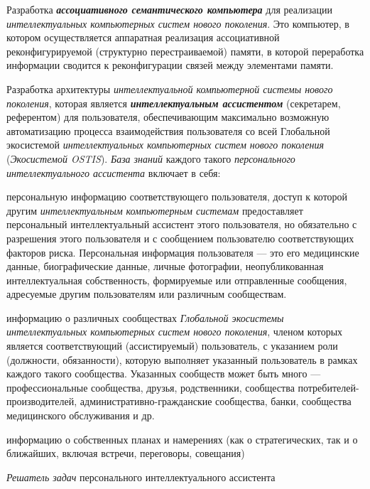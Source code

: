 \begin{textitemize}
	Разработка \textbf{\textit{ассоциативного семантического компьютера}} для реализации \textit{интеллектуальных компьютерных систем нового поколения}. Это  компьютер, в котором осуществляется аппаратная реализация ассоциативной реконфигурируемой (структурно перестраиваемой) памяти, в которой переработка информации сводится к реконфигурации связей между элементами памяти.
	\medskip
	\item Разработка архитектуры \textit{интеллектуальной компьютерной системы нового поколения}, которая является \textbf{\textit{ интеллектуальным ассистентом}} (секретарем, референтом) для  пользователя, обеспечивающим максимально возможную автоматизацию процесса взаимодействия пользователя со всей Глобальной экосистемой \textit{интеллектуальных компьютерных систем нового поколения} (\textit{Экосистемой OSTIS}). \textit{База знаний} каждого такого \textit{персонального интеллектуального ассистента} включает в себя:
	\begin{textitemize}
		\item персональную информацию соответствующего пользователя, доступ к которой другим \textit{интеллектуальным компьютерным системам} предоставляет персональный интеллектуальный ассистент этого пользователя, но обязательно с разрешения этого пользователя и с сообщением пользователю соответствующих факторов риска. Персональная информация пользователя --- это его медицинские данные, биографические данные, личные фотографии, неопубликованная интеллектуальная собственность, формируемые или отправленные сообщения, адресуемые другим пользователям или различным сообществам.
		\item информацию о различных сообществах \textit{Глобальной экосистемы интеллектуальных компьютерных систем нового поколения}, членом которых является соответствующий (ассистируемый) пользователь, с указанием роли (должности, обязанности), которую выполняет указанный пользователь в рамках каждого такого сообщества. Указанных сообществ может быть много --- профессиональные сообщества, друзья, родственники, сообщества потребителей-производителей, административно-гражданские сообщества, банки, сообщества медицинского обслуживания и др.
		\item информацию о собственных планах и намерениях (как о стратегических, так и о ближайших, включая встречи, переговоры, совещания)
	\end{textitemize}
	\textit{Решатель задач} персонального интеллектуального ассистента
	\begin{textitemize}

\end{textitemize}
\end{textitemize}
